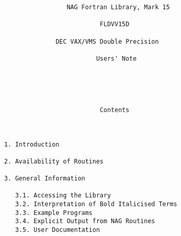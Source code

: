 \begin{small}
\begin{verbatim}
                       NAG Fortran Library, Mark 15                             
                                                                                
                                FLDVV15D                                        
                                                                                
                    DEC VAX/VMS Double Precision                                
                                                                                
                               Users' Note                                      
                                                                                
                                                                                
                                                                                
                                                                                
                                                                                
                                Contents                                        
                                                                                
                                                                                
                                                                                
      1. Introduction                                                           
                                                                                
      2. Availability of Routines                                               
                                                                                
      3. General Information                                                    
                                                                                
         3.1. Accessing the Library                                             
         3.2. Interpretation of Bold Italicised Terms                           
         3.3. Example Programs                                                  
         3.4. Explicit Output from NAG Routines                                 
         3.5. User Documentation                                                
                                                                                

\end{verbatim}
\end{small}

